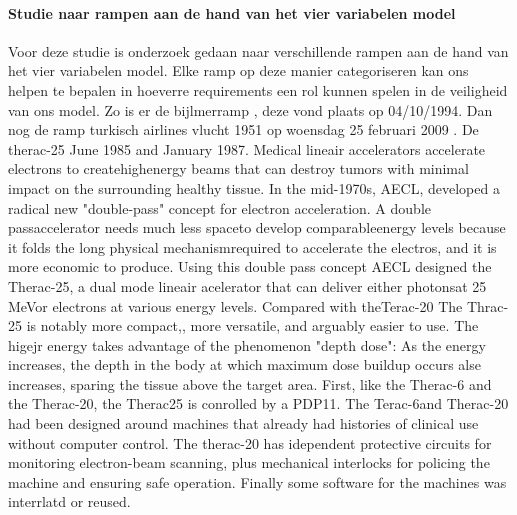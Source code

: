 \paragraph{Studie naar rampen aan de hand van het vier variabelen model}
\newline Voor deze studie is onderzoek gedaan naar verschillende rampen aan de hand van het vier variabelen model.
Elke ramp op deze manier categoriseren  kan ons helpen te bepalen in hoeverre requirements een rol kunnen spelen in de veiligheid van ons model.  Zo is er de bijlmerramp \cite{aviationsafety04101992airplaneCrashBijlmer}
, deze vond plaats op 04/10/1994. Dan nog de  ramp turkisch airlines vlucht 1951 op woensdag 25 februari 2009 \cite{catsr25022009Boeing737AmsterdamCrash}
\cite{zuilen23022019Tijdlijnpoldercrash}
\cite{wikinews04032009techfoutailines1951}
\cite{luchtvaartnieuws21012020boeing737conclusies}
\cite{adformatie280220209communicatiegebreken}
\cite{spinnael25022009onderzoekpolderbaancrash}
\cite{crashTurkishAirlines}
\cite{flightradar24}
\cite{flightstatstracker}. 
\newline \indent
De therac-25 June 1985 and January 1987. 
Medical lineair accelerators accelerate electrons to createhighenergy beams that can destroy tumors with minimal impact on the surrounding healthy tissue.
In the mid-1970s, AECL, developed a radical new "double-pass" concept for electron acceleration. A double passaccelerator needs much less spaceto develop comparableenergy levels because it folds the long  physical mechanismrequired to accelerate the electros, and it is more economic to produce.
Using this double pass concept AECL designed the  Therac-25, a dual mode lineair acelerator that can deliver either photonsat 25 MeVor electrons at various energy levels. Compared with theTerac-20 The Thrac-25 is notably more compact,, more versatile, and arguably easier to use. 
The higejr energy takes advantage of the phenomenon "depth dose": As the energy increases, the depth in the body at which maximum dose buildup occurs alse increases, sparing the tissue above the target area.
First, like the Therac-6 and the Therac-20, the Therac25 is conrolled by a PDP11. The Terac-6and Therac-20 had been designed around machines that already had histories of clinical use without computer control.
The therac-20 has idependent protective circuits for monitoring electron-beam scanning, plus mechanical interlocks for policing the machine and ensuring safe operation.
Finally some software for the machines was interrlatd or reused.

